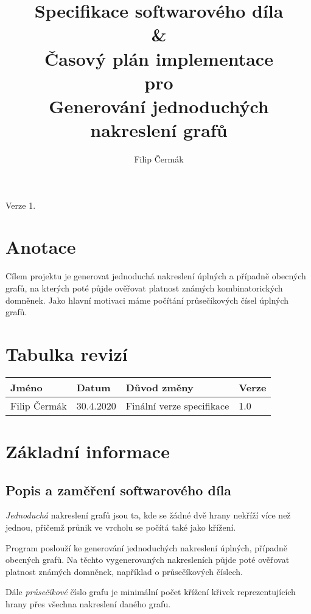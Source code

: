 \documentclass{article}
\title{Specifikace softwarového díla \\
\&\\
Časový plán implementace \\
pro \\
\textbf{Generování jednoduchých nakreslení grafů}}
\author{Filip Čermák}
\begin{document}
\maketitle

\begin{center}
    Verze 1. 
\end{center}

{\centering
\section*{Anotace}}
Cílem projektu je generovat jednoduchá nakreslení úplných a případně obecných grafů, na kterých poté půjde ověřovat platnost známých kombinatorických domněnek.
Jako hlavní motivaci máme počítání průsečíkových čísel úplných grafů.

\clearpage
\tableofcontents

\clearpage

\section*{Tabulka revizí}
\begin{tabular}{ |p{3cm}|p{2cm}|p{4cm}|p{3cm}|  }
\hline
Jméno & Datum & Důvod změny & Verze\\
\hline
\hline
Filip Čermák & 30.4.2020 & Finální verze specifikace & 1.0\\
\hline
\end{tabular}

\clearpage

\section{Základní informace}

\subsection{Popis a zaměření softwarového díla}

{\it Jednoduchá} nakreslení grafů jsou ta, kde se žádné dvě hrany nekříží více než jednou, přičemž průnik ve vrcholu se počítá také jako křížení.

Program poslouží ke generování jednoduchých nakreslení úplných, případně obecných grafů. Na těchto vygenerovaných nakresleních půjde poté ověřovat platnost známých domněnek, například o průsečíkových číslech. 

Dále {\it průsečíkové} číslo grafu je minimální počet křížení křivek reprezentujících hrany přes všechna nakreslení daného grafu.
\end{document}
